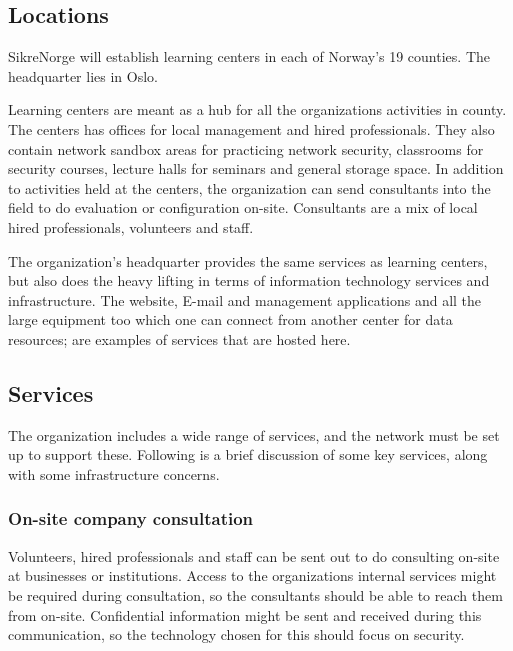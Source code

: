 \subsection{Locations}

SikreNorge will establish learning centers in each of Norway's 19 counties. The headquarter lies in Oslo.


Learning centers are meant as a hub for all the organizations activities in county. The centers has offices for local management and hired professionals. They also contain network sandbox areas for practicing network security, classrooms for security courses, lecture halls for seminars and general storage space. In addition to activities held at the centers, the organization can send consultants into the field to do evaluation or configuration on-site. Consultants are a mix of local hired professionals, volunteers and staff.

The organization's headquarter provides the same services as learning centers, but also does the heavy lifting in terms of information technology services and infrastructure. The website, E-mail and management applications and all the large equipment too which one can connect from another center for data resources; are examples of services that are hosted here.

\subsection{Services}

The organization includes a wide range of services, and the network must be set up to support these. Following is a brief discussion of some key services, along with some infrastructure concerns.


\subsubsection{On-site company consultation}

Volunteers, hired professionals and staff  can be sent out to do consulting on-site at businesses or institutions. Access to the organizations internal services might be required during consultation, so the consultants should be able to reach them from on-site. Confidential information might be sent and received during this communication, so the technology chosen for this should focus on security.

